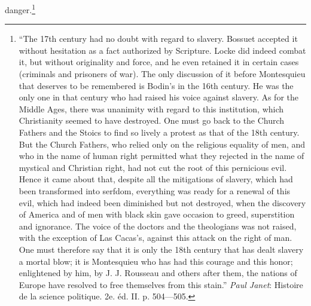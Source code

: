 \documentclass[12pt,a4paper,openany]{book}
\begin{document}
danger.\footnote[1]{``The 17th century had no doubt with regard to
slavery. Bossuet accepted it without hesitation as a fact authorized by
Scripture. Locke did indeed combat it, but without originality and force,
and he even retained it in certain cases (criminals and prisoners of war).
The only discussion of it before Montesquieu that deserves to be
remembered is Bodin's in the 16th century. He was the only one in that
century who had raised his voice against slavery. As for the Middle Ages,
there was unanimity with regard to this institution, which Christianity
seemed to have destroyed. One must go back to the Church Fathers and the
Stoics to find so lively a protest as that of the 18th century. But the
Church Fathers, who relied only on the religious equality of men, and who
in the name of human right permitted what they rejected in the name of
mystical and Christian right, had not cut the root of this pernicious
evil. Hence it came about that, despite all the mitigations of slavery,
which had been transformed into serfdom, everything was ready for a
renewal of this evil, which had indeed been diminished but not destroyed,
when the discovery of America and of men with black skin gave occasion to
greed, superstition and ignorance. The voice of the doctors and the
theologians was not raised, with the exception of Las Cacas's, against
this attack on the right of man. One must therefore say that it is only
the 18th century that has dealt slavery a mortal blow; it is Montesquieu
who has had this courage and this honor; enlightened by him, by J. J.
Rousseau and others after them, the nations of Europe have resolved to
free themselves from this stain.'' \emph{Paul Janet}: Histoire de la
science politique. 2e. éd. II. p. 504---505.} %
\end{document}
